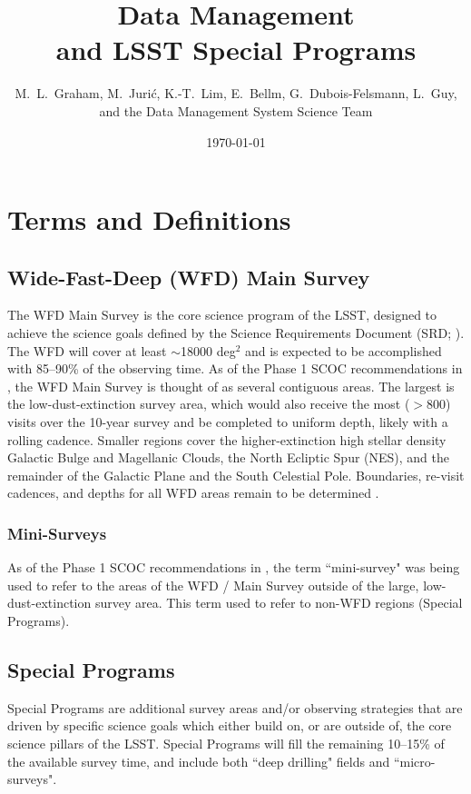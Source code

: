 \documentclass[DM,lsstdoc,toc]{lsstdoc}
\title[LSST Special Programs]{Data Management \\ and LSST Special Programs}
\author{M.~L.~Graham, M.~Juri\'{c}, K.-T.~Lim, E.~Bellm, G.~Dubois-Felsmann, L.~Guy, and the Data Management System Science Team}
\date{\today}
\begin{document}
\maketitle


\section{Terms and Definitions} \label{sec:terms}

\subsection{Wide-Fast-Deep (WFD) Main Survey}\label{ssec:terms_wfd}
The WFD Main Survey is the core science program of the LSST, designed to achieve the science goals defined by the Science Requirements Document (SRD; ).
The WFD will cover at least $\sim$18000 deg$^2$ and is expected to be accomplished with 85--90\% of the observing time.
As of the Phase 1 SCOC recommendations in , the WFD Main Survey is thought of as several contiguous areas.
The largest is the low-dust-extinction survey area, which would also receive the most ($>$800) visits over the 10-year survey and be completed to uniform depth, likely with a rolling cadence.
Smaller regions cover the higher-extinction high stellar density Galactic Bulge and Magellanic Clouds, the North Ecliptic Spur (NES), and the remainder of the Galactic Plane and the South Celestial Pole.
Boundaries, re-visit cadences, and depths for all WFD areas remain to be determined .

\subsubsection{Mini-Surveys}\label{sssec:terms_wfd_mini}
As of the Phase 1 SCOC recommendations in , the term ``mini-survey" was being used to refer to the areas of the WFD / Main Survey outside of the large, low-dust-extinction survey area.
This term used to refer to non-WFD regions (Special Programs).

\subsection{Special Programs}\label{ssec:terms_sp}
Special Programs are additional survey areas and/or observing strategies that are driven by specific science goals which either build on, or are outside of, the core science pillars of the LSST.
Special Programs will fill the remaining 10--15\% of the available survey time, and include both ``deep drilling" fields and ``micro-surveys".
\end{document}
